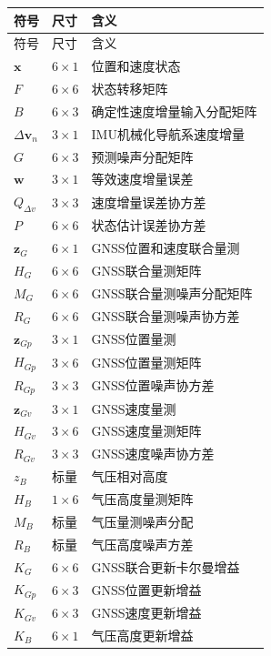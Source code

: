 \documentclass[12pt,a4paper]{ctexart}
\begin{document}
\begin{longtable}{>{\raggedright\arraybackslash}p{3cm}
                  >{\centering\arraybackslash}p{2.5cm}
                  >{\raggedright\arraybackslash}p{8cm}}
\toprule
符号 & 尺寸 & 含义\\
\midrule
\endfirsthead
\toprule
符号 & 尺寸 & 含义\\
\midrule
\endhead
$\mathbf x$ & $6\times1$ & 位置和速度状态\\
$F$ & $6\times6$ & 状态转移矩阵\\
$B$ & $6\times3$ & 确定性速度增量输入分配矩阵\\
$\Delta\mathbf v_n$ & $3\times1$ & IMU机械化导航系速度增量\\
$G$ & $6\times3$ & 预测噪声分配矩阵\\
$\mathbf w$ & $3\times1$ & 等效速度增量误差\\
$Q_{\Delta v}$ & $3\times3$ & 速度增量误差协方差\\
$P$ & $6\times6$ & 状态估计误差协方差\\
$\mathbf z_G$ & $6\times1$ & GNSS位置和速度联合量测\\
$H_G$ & $6\times6$ & GNSS联合量测矩阵\\
$M_G$ & $6\times6$ & GNSS联合量测噪声分配矩阵\\
$R_G$ & $6\times6$ & GNSS联合量测噪声协方差\\
$\mathbf z_{Gp}$ & $3\times1$ & GNSS位置量测\\
$H_{Gp}$ & $3\times6$ & GNSS位置量测矩阵\\
$R_{Gp}$ & $3\times3$ & GNSS位置噪声协方差\\
$\mathbf z_{Gv}$ & $3\times1$ & GNSS速度量测\\
$H_{Gv}$ & $3\times6$ & GNSS速度量测矩阵\\
$R_{Gv}$ & $3\times3$ & GNSS速度噪声协方差\\
$z_B$ & 标量 & 气压相对高度\\
$H_B$ & $1\times6$ & 气压高度量测矩阵\\
$M_B$ & 标量 & 气压量测噪声分配\\
$R_B$ & 标量 & 气压高度噪声方差\\
$K_G$ & $6\times6$ & GNSS联合更新卡尔曼增益\\
$K_{Gp}$ & $6\times3$ & GNSS位置更新增益\\
$K_{Gv}$ & $6\times3$ & GNSS速度更新增益\\
$K_B$ & $6\times1$ & 气压高度更新增益\\
\bottomrule
\end{longtable}
\end{document}
